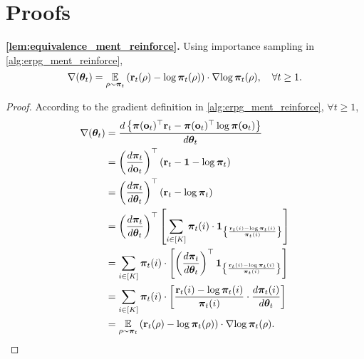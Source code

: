 \section{Proofs}

{\bf \cref{lem:equivalence_ment_reinforce}.} Using importance sampling in \cref{alg:erpg_ment_reinforce},
\begin{equation*}
    \nabla{({\boldsymbol{\theta}}_t)} = \operatorname*{{\mathbb{E}}}\limits_{\rho \sim {\boldsymbol{\pi}}_t}{ \left( {\mathbf{r}}_t(\rho) - \log{{\boldsymbol{\pi}}_t(\rho)} \right) \cdot \nabla{ \log{{\boldsymbol{\pi}}_t(\rho)} } }, \quad \forall t \ge 1.
\end{equation*}
\begin{proof}
According to the gradient definition in \cref{alg:erpg_ment_reinforce}, $\forall t \ge 1$,
\begin{equation*}
\begin{split}
    \nabla{({\boldsymbol{\theta}}_t)} &= \frac{d \left\{ {\boldsymbol{\pi}}({\mathbf{o}}_t)^\top {\mathbf{r}}_t - {\boldsymbol{\pi}}({\mathbf{o}}_t)^\top \log{{\boldsymbol{\pi}}({\mathbf{o}}_t)} \right\} }{d {\boldsymbol{\theta}}_t} \\
    &= \left( \frac{d {\boldsymbol{\pi}}_t}{d {\mathbf{o}}_t} \right)^\top \left( {\mathbf{r}}_t - {\mathbf{1}} - \log{{\boldsymbol{\pi}}_t} \right) \\
    &= \left( \frac{d {\boldsymbol{\pi}}_t}{d {\boldsymbol{\theta}}_t} \right)^\top \left( {\mathbf{r}}_t - \log{{\boldsymbol{\pi}}_t} \right) \\
    &= \left( \frac{d {\boldsymbol{\pi}}_t}{d {\boldsymbol{\theta}}_t} \right)^\top \left[ \sum\limits_{i \in [K]}{ {\boldsymbol{\pi}}_t(i) \cdot {\mathbf{1}}_{ \left\{ \frac{{\mathbf{r}}_t(i) - \log{{\boldsymbol{\pi}}_t(i)} }{{\boldsymbol{\pi}}_t(i)} \right\} } } \right]  \\
    &= \sum\limits_{i \in [K]}{ {\boldsymbol{\pi}}_t(i) \cdot \left[ \left( \frac{d {\boldsymbol{\pi}}_t}{d {\boldsymbol{\theta}}_t} \right)^\top {\mathbf{1}}_{ \left\{ \frac{{\mathbf{r}}_t(i) - \log{{\boldsymbol{\pi}}_t(i)} }{{\boldsymbol{\pi}}_t(i)} \right\} } \right] } \\
    &= \sum\limits_{i \in [K]}{ {\boldsymbol{\pi}}_t(i) \cdot \left[ \frac{{\mathbf{r}}_t(i) - \log{{\boldsymbol{\pi}}_t(i)} }{{\boldsymbol{\pi}}_t(i)} \cdot \frac{d {\boldsymbol{\pi}}_t(i)}{d {\boldsymbol{\theta}}_t}  \right] } \\
    &= \operatorname*{{\mathbb{E}}}\limits_{\rho \sim {\boldsymbol{\pi}}_t}{ \left( {\mathbf{r}}_t(\rho) - \log{{\boldsymbol{\pi}}_t(\rho)} \right) \cdot \nabla{ \log{{\boldsymbol{\pi}}_t(\rho)} } }. \qedhere
\end{split}
\end{equation*}
\end{proof}

